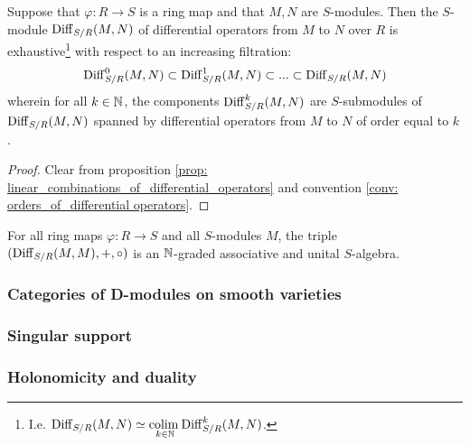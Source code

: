             \begin{proposition} \label{prop: filtering_differential_operators_by_orders}
                Suppose that $\varphi:  R \to S$ is a ring map and that $M, N$ are $S$-modules. Then the $S$-module $\mathrm{Diff}_{S/R}(M, N)$ of differential operators from $M$ to $N$ over $R$ is exhaustive\footnote{I.e. $\mathrm{Diff}_{S/R}(M, N) \simeq \underset{k \in \mathbb{N}}{\operatorname{colim} \:} \mathrm{Diff}_{S/R}^k(M, N)$.} with respect to an increasing filtration:
                    $$\mathrm{Diff}_{S/R}^0(M, N) \subset \mathrm{Diff}_{S/R}^1(M, N) \subset ... \subset \mathrm{Diff}_{S/R}(M, N)$$
                wherein for all $k \in \mathbb{N}$, the components $\mathrm{Diff}_{S/R}^k(M, N)$ are $S$-submodules of $\mathrm{Diff}_{S/R}(M, N)$ spanned by differential operators from $M$ to $N$ of order equal to $k$. 
            \end{proposition}
                \begin{proof}
                    Clear from proposition \ref{prop: linear_combinations_of_differential_operators} and convention \ref{conv: orders_of_differential operators}.
                \end{proof}
            \begin{corollary} \label{coro: rings_of_differential_operators}
                For all ring maps $\varphi: R \to S$ and all $S$-modules $M$, the triple $(\mathrm{Diff}_{S/R}(M, M), +, \circ)$ is an $\mathbb{N}$-graded associative and unital $S$-algebra. 
            \end{corollary}
    
        \subsubsection{Categories of D-modules on smooth varieties}
        
        \subsubsection{Singular support}
        
        \subsubsection{Holonomicity and duality}